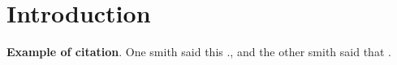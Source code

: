 \section{Introduction}

\textbf{Example of citation}. 
One smith said this \parencite{Smith:2013jd}., and the other smith said that \parencite{Smith:2012qr}.
\lipsum[2]